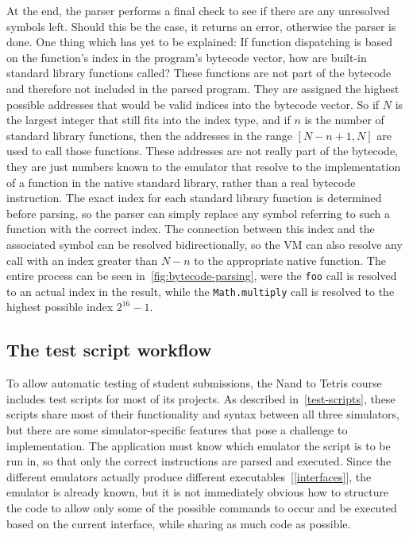 At the end, the parser performs a final check to see if there are any unresolved symbols left.
Should this be the case, it returns an error, otherwise the parser is done.
One thing which has yet to be explained: If function dispatching is based on the function's index in the program's bytecode vector, how are built-in standard library functions called?
These functions are not part of the bytecode and therefore not included in the parsed program.
They are assigned the highest possible addresses that would be valid indices into the bytecode vector.
So if \(N\) is the largest integer that still fits into the index type, and if \(n\) is the number of standard library functions, then the addresses in the range \([N - n + 1, N]\) are used to call those functions.
These addresses are not really part of the bytecode, they are just numbers known to the emulator that resolve to the implementation of a function in the native standard library, rather than a real bytecode instruction.
The exact index for each standard library function is determined before parsing, so the parser can simply replace any symbol referring to such a function with the correct index.
The connection between this index and the associated symbol can be resolved bidirectionally, so the VM can also resolve any call with an index greater than \(N - n\) to the appropriate native function.
The entire process can be seen in~\cref{fig:bytecode-parsing}, were the \verb+foo+ call is resolved to an actual index in the result, while the \verb+Math.multiply+ call is resolved to the highest possible index \(2^{16}-1\).

\subsection{The test script workflow} \label{test-script-workflow}
To allow automatic testing of student submissions, the Nand to Tetris course includes test scripts for most of its projects.
As described in~\cref{test-scripts}, these scripts share most of their functionality and syntax between all three simulators, but there are some simulator-specific features that pose a challenge to implementation.
The application must know which emulator the script is to be run in, so that only the correct instructions are parsed and executed.
Since the different emulators actually produce different executables~[\ref{interfaces}], the emulator is already known, but it is not immediately obvious how to structure the code to allow only some of the possible commands to occur and be executed based on the current interface, while sharing as much code as possible.

